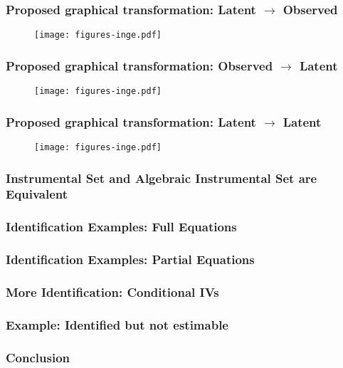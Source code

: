 \documentclass{beamer}
\begin{document}
\begin{frame}
	\frametitle{Proposed graphical transformation: Latent $ \rightarrow $ Observed}
	\begin{figure}
		\centering
		\texttt{[image: figures-inge.pdf]}
		\caption{}
		\label{fig:l2o_parent}
	\end{figure}
\end{frame}
\begin{frame}
	\frametitle{Proposed graphical transformation: Observed $ \rightarrow $ Latent}
	\begin{figure}
		\centering
		\texttt{[image: figures-inge.pdf]}
		\caption{}
		\label{fig:l2o_child}
	\end{figure}
\end{frame}
\begin{frame}
	\frametitle{Proposed graphical transformation: Latent $ \rightarrow $ Latent}
	\begin{figure}
		\centering
		\texttt{[image: figures-inge.pdf]}
		\caption{}
		\label{fig:l2o_both}
	\end{figure}
\end{frame}

\begin{frame}
	\frametitle{Instrumental Set and Algebraic Instrumental Set are Equivalent}
\end{frame}

\begin{frame}
	\frametitle{Identification Examples: Full Equations}
\end{frame}

\begin{frame}
	\frametitle{Identification Examples: Partial Equations}
\end{frame}

\begin{frame}
	\frametitle{More Identification: Conditional IVs}
\end{frame}

\begin{frame}
	\frametitle{Example: Identified but not estimable}
\end{frame}

\begin{frame}
	\frametitle{Conclusion}
\end{frame}
\end{document}

